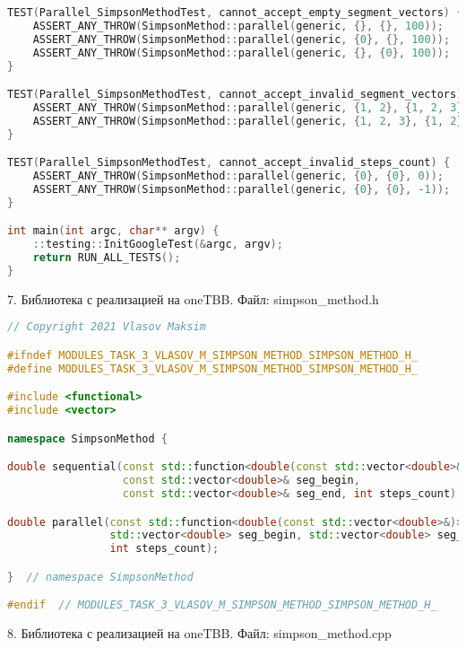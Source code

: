 \documentclass{report}
\begin{document}
\begin{lstlisting}[language=C++]
TEST(Parallel_SimpsonMethodTest, cannot_accept_empty_segment_vectors) {
    ASSERT_ANY_THROW(SimpsonMethod::parallel(generic, {}, {}, 100));
    ASSERT_ANY_THROW(SimpsonMethod::parallel(generic, {0}, {}, 100));
    ASSERT_ANY_THROW(SimpsonMethod::parallel(generic, {}, {0}, 100));
}

TEST(Parallel_SimpsonMethodTest, cannot_accept_invalid_segment_vectors) {
    ASSERT_ANY_THROW(SimpsonMethod::parallel(generic, {1, 2}, {1, 2, 3}, 100));
    ASSERT_ANY_THROW(SimpsonMethod::parallel(generic, {1, 2, 3}, {1, 2}, 100));
}

TEST(Parallel_SimpsonMethodTest, cannot_accept_invalid_steps_count) {
    ASSERT_ANY_THROW(SimpsonMethod::parallel(generic, {0}, {0}, 0));
    ASSERT_ANY_THROW(SimpsonMethod::parallel(generic, {0}, {0}, -1));
}

int main(int argc, char** argv) {
    ::testing::InitGoogleTest(&argc, argv);
    return RUN_ALL_TESTS();
}
\end{lstlisting}

\par 7. Библиотека с реализацией на oneTBB. Файл: simpson\_method.h

\begin{lstlisting}[language=C++]
// Copyright 2021 Vlasov Maksim

#ifndef MODULES_TASK_3_VLASOV_M_SIMPSON_METHOD_SIMPSON_METHOD_H_
#define MODULES_TASK_3_VLASOV_M_SIMPSON_METHOD_SIMPSON_METHOD_H_

#include <functional>
#include <vector>

namespace SimpsonMethod {

double sequential(const std::function<double(const std::vector<double>&)>& func,
                  const std::vector<double>& seg_begin,
                  const std::vector<double>& seg_end, int steps_count);

double parallel(const std::function<double(const std::vector<double>&)>& func,
                std::vector<double> seg_begin, std::vector<double> seg_end,
                int steps_count);

}  // namespace SimpsonMethod

#endif  // MODULES_TASK_3_VLASOV_M_SIMPSON_METHOD_SIMPSON_METHOD_H_
\end{lstlisting}

\par 8. Библиотека с реализацией на oneTBB. Файл: simpson\_method.cpp
\end{document}
